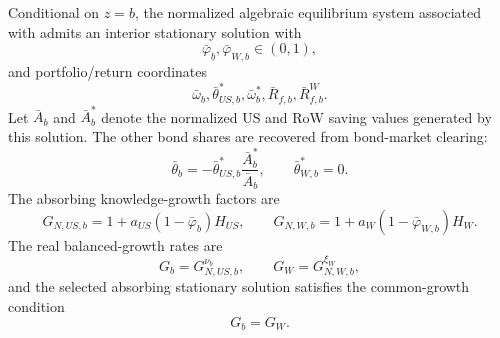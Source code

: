 \documentclass{article}
\begin{document}
\begin{ass}\label{ass_absorbing_stationary_equilibrium_selection}
Conditional on $z=b$, the normalized algebraic equilibrium system associated with  admits an interior stationary solution with
\[
\bar\varphi_b,\bar\varphi_{W,b}\in(0,1),
\]
and portfolio/return coordinates
\[
\bar\omega_b,\bar\theta_{US,b}^*,\bar\omega_b^*,\bar R_{f,b},\bar R^W_{f,b}.
\]
Let $\bar A_b$ and $\bar A_b^*$ denote the normalized US and RoW saving values generated by this solution. The other bond shares are recovered from bond-market clearing:
\[
\bar\theta_b
=
-\bar\theta_{US,b}^*\frac{\bar A_b^*}{\bar A_b},
\qquad
\bar\theta_{W,b}^*=0.
\]
The absorbing knowledge-growth factors are
\[
G_{N,US,b}
=
1+a_{US}(1-\bar\varphi_b)H_{US},
\qquad
G_{N,W,b}
=
1+a_W(1-\bar\varphi_{W,b})H_W.
\]
The real balanced-growth rates are
\[
G_b=G_{N,US,b}^{\nu_b},
\qquad
G_W=G_{N,W,b}^{\xi_W},
\]
and the selected absorbing stationary solution satisfies the common-growth condition
\[
G_b=G_W.
\]
\end{ass}
\end{document}
